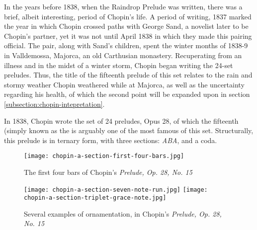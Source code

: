 In the years before 1838, when the Raindrop Prelude was written, there was a brief, albeit interesting, period of Chopin's life. A period of writing, 1837 marked the year in which Chopin crossed paths with George Sand, a novelist later to be Chopin's partner, yet it was not until April 1838 in which they made this pairing official. The pair, along with Sand's children, spent the winter months of 1838-9 in Valldemossa, Majorca, an old Carthusian monastery. Recuperating from an illness and in the midst of a winter storm, Chopin began writing the 24-set preludes\autocite{Samson_2001}. Thus, the title of the fifteenth prelude of this set relates to the rain and stormy weather Chopin weathered while at Majorca, as well as the uncertainty regarding his health, of which the second point will be expanded upon in section \ref{subsection:chopin-intepretation}.

In 1838, Chopin wrote the set of 24 preludes, Opus 28, of which the fifteenth (simply known as the  is arguably one of the most famous of this set. Structurally, this prelude is in ternary form, with three sections: \textit{ABA}, and a coda. 

\begin{figure}
  \centering
  \texttt{[image: chopin-a-section-first-four-bars.jpg]}
  \caption{The first four bars of Chopin's \textit{Prelude, Op. 28, No. 15}}
  \label{fig:chopin-a-section-first-four-bars}
\end{figure}

\begin{figure}
  \centering
  \texttt{[image: chopin-a-section-seven-note-run.jpg]}
  \texttt{[image: chopin-a-section-triplet-grace-note.jpg]}
  \caption{Several examples of ornamentation, in Chopin's \textit{Prelude, Op. 28, No. 15}}
  \label{fig:chopin-a-section-examples-ornamentation}
\end{figure}



